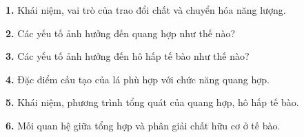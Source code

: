 \documentclass[11pt,a4paper]{article}
\begin{document}
\textbf{1.} Khái niệm, vai trò của trao đổi chất và chuyển hóa năng lượng.
\par\vspace{1pt}\noindent\dotfill\par\vspace{3pt}\noindent\dotfill\par\vspace{3pt}\noindent\dotfill\par\vspace{3pt}\noindent
\textbf{2.} Các yếu tố ảnh hưởng đến quang hợp như thế nào?
\par\vspace{1pt}\noindent\dotfill\par\vspace{3pt}\noindent\dotfill\par\vspace{3pt}\noindent\dotfill\par\vspace{3pt}\noindent
\textbf{3.} Các yếu tố ảnh hưởng đến hô hấp tế bào như thế nào?
\par\vspace{1pt}\noindent\dotfill\par\vspace{3pt}\noindent\dotfill\par\vspace{3pt}\noindent\dotfill\par\vspace{3pt}\noindent
\textbf{4.} Đặc điểm cấu tạo của lá phù hợp với chức năng quang hợp.
\par\vspace{1pt}\noindent\dotfill\par\vspace{3pt}\noindent\dotfill\par\vspace{3pt}\noindent\dotfill\par\vspace{3pt}\noindent
\textbf{5.} Khái niệm, phương trình tổng quát của quang hợp, hô hấp tế bào.
\par\vspace{1pt}\noindent\dotfill\par\vspace{3pt}\noindent\dotfill\par\vspace{3pt}\noindent\dotfill\par\vspace{3pt}\noindent
\textbf{6.} Mối quan hệ giữa tổng hợp và phân giải chất hữu cơ ở tế bào.
\end{document}

